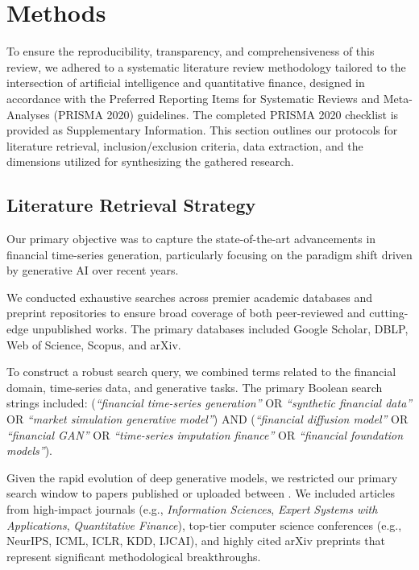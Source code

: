 \section{Methods}
\label{sec:methods}

To ensure the reproducibility, transparency, and comprehensiveness of this review, we adhered to a systematic literature review methodology tailored to the intersection of artificial intelligence and quantitative finance, designed in accordance with the Preferred Reporting Items for Systematic Reviews and Meta-Analyses (PRISMA 2020) guidelines. The completed PRISMA 2020 checklist is provided as Supplementary Information. This section outlines our protocols for literature retrieval, inclusion/exclusion criteria, data extraction, and the dimensions utilized for synthesizing the gathered research.

\subsection{Literature Retrieval Strategy}
Our primary objective was to capture the state-of-the-art advancements in financial time-series generation, particularly focusing on the paradigm shift driven by generative AI over recent years.

We conducted exhaustive searches across premier academic databases and preprint repositories to ensure broad coverage of both peer-reviewed and cutting-edge unpublished works. The primary databases included Google Scholar, DBLP, Web of Science, Scopus, and arXiv.

To construct a robust search query, we combined terms related to the financial domain, time-series data, and generative tasks. The primary Boolean search strings included:
(\textit{``financial time-series generation''} OR \textit{``synthetic financial data''} OR \textit{``market simulation generative model''}) AND (\textit{``financial diffusion model''} OR \textit{``financial GAN''} OR \textit{``time-series imputation finance''} OR \textit{``financial foundation models''}).

Given the rapid evolution of deep generative models, we restricted our primary search window to papers published or uploaded between . We included articles from high-impact journals (e.g., \textit{Information Sciences}, \textit{Expert Systems with Applications}, \textit{Quantitative Finance}), top-tier computer science conferences (e.g., NeurIPS, ICML, ICLR, KDD, IJCAI), and highly cited arXiv preprints that represent significant methodological breakthroughs.

